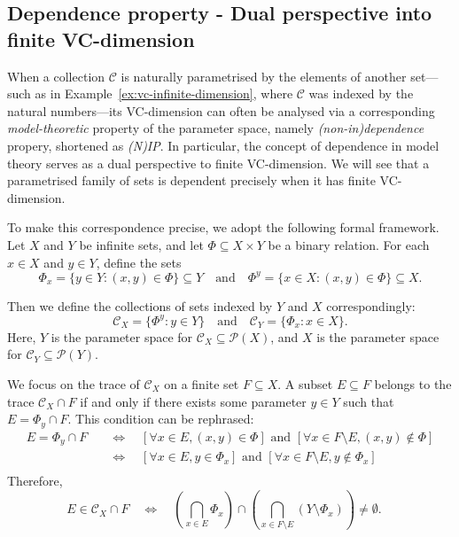 \subsection{Dependence property - Dual perspective into finite VC-dimension}

When a collection $\mathcal{C}$ is naturally parametrised by the elements of another set—such as in Example~\ref{ex:vc-infinite-dimension}, where $\mathcal{C}$ was indexed by the natural numbers—its VC-dimension can often be analysed via a corresponding \textit{model-theoretic} property of the parameter space, namely \textit{(non-in)dependence} propery, shortened as \textit{(N)IP}. In particular, the concept of dependence in model theory serves as a dual perspective to finite VC-dimension. We will see that a parametrised family of sets is dependent precisely when it has finite VC-dimension.

To make this correspondence precise, we adopt the following formal framework. Let $X$ and $Y$ be infinite sets, and let $\Phi \subseteq X \times Y$ be a binary relation. For each $x \in X$ and $y \in Y$, define the sets
\[
    \Phi_x = \{y \in Y : (x,y) \in \Phi\} \subseteq Y \quad \text{and} \quad \Phi^y = \{x \in X : (x,y) \in \Phi\} \subseteq X.
\]

\noindent
Then we define the collections of sets indexed by $Y$ and $X$ correspondingly:
\[
    \mathcal{C}_X = \{\Phi^y : y \in Y\}  \quad \text{and} \quad \mathcal{C}_Y = \{\Phi_x : x \in X\}.
\]
\noindent
Here, $Y$ is the parameter space for $\mathcal{C}_X\subseteq \mathcal{P}(X)$, and $X$ is the parameter space for $\mathcal{C}_Y \subseteq \mathcal{P}(Y)$.

We focus on the trace of $\mathcal{C}_X$ on a finite set $F \subseteq X$. A subset $E \subseteq F$ belongs to the trace $\mathcal{C}_X \cap F$ if and only if there exists some parameter $y \in Y$ such that $E = \Phi_y \cap F$. This condition can be rephrased:
\[
    \begin{aligned}
        E = \Phi_y \cap F \quad &\Leftrightarrow \quad [\forall x \in E, (x,y) \in \Phi] \text{ and } [\forall x \in F \setminus E, (x,y) \notin \Phi] \\
        &\Leftrightarrow \quad [\forall x \in E, y \in \Phi_x] \text{ and } [\forall x \in F \setminus E, y \notin \Phi_x] \\
    \end{aligned}
\]
Therefore,
\begin{equation}
    \label{eq:trace-condition}
    E \in \mathcal{C}_X \cap F \quad \Leftrightarrow \quad \left( \bigcap_{x \in E} \Phi_x \right) \cap \left( \bigcap_{x \in F \setminus E} (Y \setminus \Phi_x) \right) \neq \emptyset. \quad
\end{equation}


